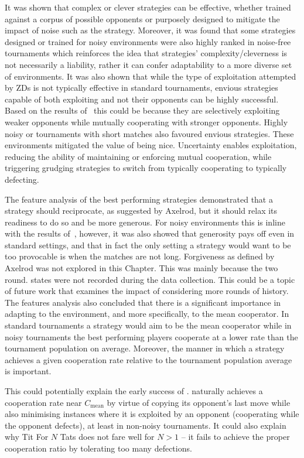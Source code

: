 It was shown that complex or clever strategies can be effective,
whether trained against a corpus of possible opponents or purposely designed to
mitigate the impact of noise such as the \DBS strategy. Moreover, it was found
that some strategies designed or trained for noisy environments were also highly
ranked in noise-free tournaments which reinforces the idea that strategies'
complexity/cleverness is not necessarily a liability, rather it can confer
adaptability to a more diverse set of environments.
It was also shown that while the type of exploitation attempted by ZDs is
not typically effective in standard tournaments, envious strategies
capable of both exploiting and not their opponents can be highly successful.
Based on the results of~\cite{Harper2017} this could be because they are
selectively exploiting weaker opponents while mutually cooperating with stronger
opponents. Highly noisy or tournaments with short matches also favoured envious
strategies. These environments mitigated the value of being nice. Uncertainty
enables exploitation, reducing the ability of maintaining or enforcing mutual
cooperation, while triggering grudging strategies to switch from typically
cooperating to typically defecting.

The feature analysis of the best performing strategies demonstrated that a
strategy should reciprocate, as suggested by Axelrod, but it should relax its
readiness to do so and be more generous. For noisy environments this is
inline with the results of~\cite{Bendor1991, Donninger1986, Molander1985,
Hammerstein1984}, however, it was also showed that generosity pays off even in
standard settings, and that in fact the only setting a strategy would want to be
too provocable is when the matches are not long. Forgiveness as defined by
Axelrod was not explored in this Chapter. This was mainly because the two round.
states were not recorded during the data collection. This could be a topic of
future work that examines the impact of considering more rounds of history. The
features analysis also concluded that there is a significant importance in
adapting to the environment, and more specifically, to the mean
cooperator. In standard tournaments a strategy would aim to be the mean
cooperator while in noisy tournaments the best performing players cooperate at a
lower rate than the tournament population on average. Moreover, the manner in
which a strategy achieves a given cooperation rate relative to the tournament
population average is important.

This could potentially explain the early success of \TitForTat. \TitForTat naturally achieves
a cooperation rate near $C_{\text{mean}}$ by virtue of copying its opponent's
last move while also minimising instances where it is exploited by an opponent
(cooperating while the opponent defects), at least in non-noisy tournaments. It
could also explain why Tit For \(N\) Tats does not fare well for $N > 1$ -- it
fails to achieve the proper cooperation ratio by tolerating too many defections.

